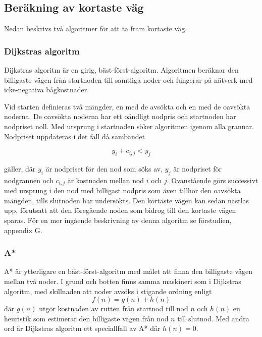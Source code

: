 \documentclass[11pt]{article}
\begin{document}
\begin{flushleft}
\subsection{Beräkning av kortaste väg}
Nedan beskrivs två algoritmer för att ta fram kortaste väg.

\subsubsection{Dijkstras algoritm}
Dijkstras algoritm är en girig, bäst-först-algoritm. Algoritmen beräknar den billigaste vägen från startnoden till samtliga noder och fungerar på nätverk med icke-negativa bågkostnader. 

Vid starten definieras två mängder, en med de avsökta och en med de oavsökta noderna. De oavsökta noderna har ett oändligt nodpris och startnoden har nodpriset noll. Med ursprung i startnoden söker algoritmen igenom alla grannar. Nodpriset uppdateras i det fall då sambandet

\begin{displaymath}
	y_i + c_{i,j} < y_j
\end{displaymath}

gäller, där \begin{math} y_i \end{math} är nodpriset för den nod som söks av, \begin{math} y_j \end{math} är nodpriset för nodgrannen och \begin{math} c_{i,j} \end{math} är kostnaden mellan nod \begin{math} i \end{math} och \begin{math} j \end{math}. Ovanstående görs successivt med ursprung i den nod med billigast nodpris som även tillhör den oavsökta mängden, tills slutnoden har undersökts. Den kortaste vägen kan sedan nästlas upp, förutsatt att den föregående noden som bidrog till den kortaste vägen sparas. För en mer ingående beskrivning av denna algoritm se förstudien, appendix G.

\subsubsection{A*}
A* är ytterligare en bäst-först-algoritm med målet att finna den billigaste vägen mellan två noder. I grund och botten finns samma maskineri som i Dijkstras algoritm, med skillnaden att noder avsöks i stigande ordning enligt
\begin{equation*}
	f(n) = g(n) + h(n)
\end{equation*}
där $g(n)$ utgör kostnaden av rutten från startnod till nod $n$ och $h(n)$ en heuristik som estimerar den billigaste vägen från nod $n$ till slutnod. Med andra ord är Dijkstras algoritm ett speciallfall av A* där $h(n) = 0$.


\end{flushleft}
\end{document}
